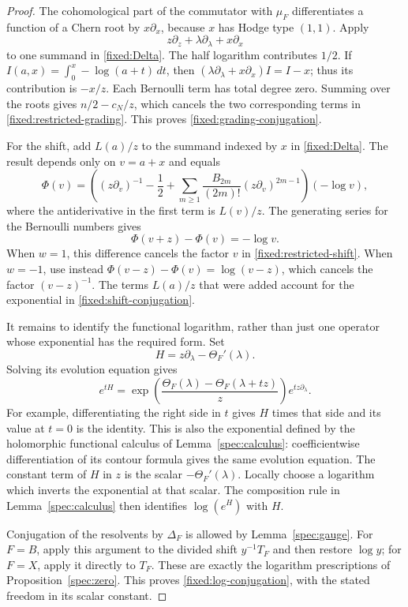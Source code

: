 \begin{proof}
The cohomological part of the commutator with $\mu_F$ differentiates a
function of a Chern root by $x\partial_x$, because $x$ has Hodge type
$(1,1)$.  Apply
\[
 z\partial_z+\lambda\partial_\lambda+x\partial_x
\]
to one summand in \eqref{fixed:Delta}.  The half logarithm contributes
$1/2$.  If $I(a,x)=\int_0^x-\log(a+t)\,dt$, then
$(\lambda\partial_\lambda+x\partial_x)I=I-x$; thus its contribution is
$-x/z$.  Each Bernoulli term has total degree zero.  Summing over the
roots gives $n/2-c_N/z$, which cancels the two corresponding terms in
\eqref{fixed:restricted-grading}.  This proves
\eqref{fixed:grading-conjugation}.

For the shift, add $L(a)/z$ to the summand indexed by $x$ in
\eqref{fixed:Delta}.  The result depends only on $v=a+x$ and equals
\[
 \Phi(v)=\left((z\partial_v)^{-1}-\frac12+
          \sum_{m\geq1}\frac{B_{2m}}{(2m)!}
                         (z\partial_v)^{2m-1}\right)(-\log v),
\]
where the antiderivative in the first term is $L(v)/z$.  The generating
series for the Bernoulli numbers gives
\begin{equation}\label{fixed:Bernoulli-difference}
 \Phi(v+z)-\Phi(v)=-\log v.
\end{equation}
When $w=1$, this difference cancels the factor $v$ in
\eqref{fixed:restricted-shift}.  When $w=-1$, use instead
$\Phi(v-z)-\Phi(v)=\log(v-z)$, which cancels the factor $(v-z)^{-1}$.
The terms $L(a)/z$ that were added account for the exponential in
\eqref{fixed:shift-conjugation}.

It remains to identify the functional logarithm, rather than just one
operator whose exponential has the required form.  Set
\[
 H=z\partial_\lambda-\Theta_F'(\lambda).
\]
Solving its evolution equation gives
\begin{equation}\label{fixed:log-flow}
 e^{tH}=
  \exp\left(
     \frac{\Theta_F(\lambda)-\Theta_F(\lambda+tz)}{z}
       \right)e^{tz\partial_\lambda}.
\end{equation}
For example, differentiating the right side in $t$ gives $H$ times that
side and its value at $t=0$ is the identity.  This is also the exponential
defined by the holomorphic functional calculus of
Lemma~\ref{spec:calculus}: coefficientwise differentiation of its contour
formula gives the same evolution equation.  The constant term of $H$ in
$z$ is the scalar $-\Theta_F'(\lambda)$.  Locally choose a logarithm
which inverts the exponential at that scalar.  The composition rule in
Lemma~\ref{spec:calculus} then identifies $\log(e^H)$ with $H$.

Conjugation of the resolvents by $\Delta_F$ is allowed by
Lemma~\ref{spec:gauge}.  For $F=B$, apply this argument to the divided
shift $y^{-1}T_F$ and then restore $\log y$; for $F=X$, apply it directly
to $T_F$.  These are exactly the logarithm prescriptions of
Proposition~\ref{spec:zero}.  This proves
\eqref{fixed:log-conjugation}, with the stated freedom in its scalar
constant.
\end{proof}

